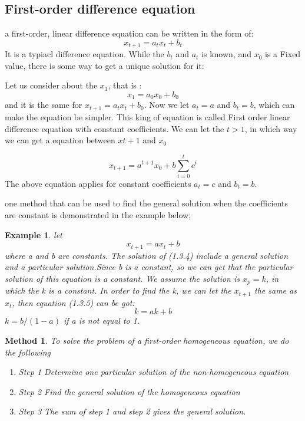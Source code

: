 \documentclass[12pt]{article}
\newtheorem{example}{Example}[section]
\newtheorem{method}{Method}[section]
\begin{document}
\subsection{First-order difference equation}

a first-order, linear difference equation can be written in the form of:
\begin{equation}
    x_{t+1}=a_{t}x_{t}+b_{t}\tag{1.3.1}
\end{equation}
It is a typiacl difference equation. While the $b_t$ and $a_t$ is known, and $x_0$ is a Fixed value, there is some way to get a unique solution for it:

Let us consider about the $x_1$, that is :
\begin{equation}
    x_1 = a_0x_0 + b_0\tag{1.3.2}
\end{equation}
and it is the same for $x_{t+1} = a_tx_t + b_0$. Now we let $a_t = a$ and $b_t = b$, which can make the equation be simpler. This king of equation is called First order linear difference equation with constant coefficients. We can let the $t > 1$, in which way we can get a equation between $x{t+1}$ and $x_0$


\begin{equation}
    x_{t+1}=a^{t+1}x_{0}+b\sum_{i=0}^{t}c^{i}\tag{1.3.3}
\end{equation}
The above equation applies for constant coefficients $a_{t}=c$ and $b_{t}=b$.

one method that can be used to find the general solution when the coefficients are constant is demonstrated in the example below;

\begin{example}
let 
\begin{equation}
    x_{t+1}=ax_{t}+b\tag{1.3.4}
\end{equation}
where a and b are constants. The solution of (1.3.4) include a general solution and a particular solution.Since b is a constant, so we can get that the particular solution of this equation is a constant. We assume the solution is $x_p=k$, in which the k is a constant. In order to find the k, we can let the $x_{t+1}$ the same as $x_t$, then equation (1.3.5) can be got: 
\begin{equation}
    k=ak+b\tag{1.3.5}
\end{equation}
$k=b/(1-a)$ if a is not equal to 1. 
\end{example}
\setcounter{method}{0}
\begin{method}
To solve the problem of a first-order homogeneous equation, we do the following
\begin{enumerate}
    \item Step 1 Determine one particular solution of the non-homogeneous equation
    \item Step 2 Find the general solution of the homogeneous equation
    \item Step 3 The sum of step 1 and step 2 gives the general solution.
\end{enumerate}
\end{method}
\end{document}
